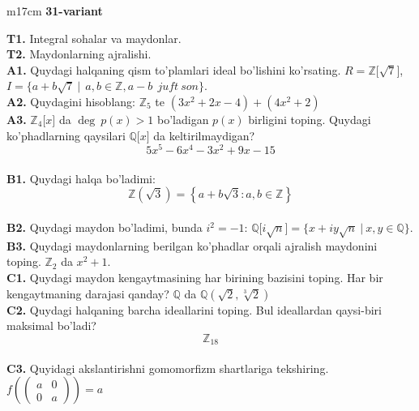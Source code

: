 \documentclass{article}
\begin{document}
\begin{tabular}{m{17cm}}
\textbf{31-variant}
\newline

\textbf{T1.} Integral sohalar va maydonlar. \\
\textbf{T2.} Maydonlarning ajralishi. \\
\textbf{A1.} Quydagi halqaning qism to'plamlari ideal bo'lishini ko'rsating.
\(R\mathbb{= Z\lbrack}\sqrt{7}\rbrack\), \(I = \{ a + b\sqrt{7}\ |\ \ a,b \in \mathbb{Z,}a - b\ \ juft\ son\}\). \\
\textbf{A2.} Quydagini hisoblang:
\(\mathbb{Z}_{5}\) te \(\left( 3x^{2} + 2x - 4 \right) + \left( 4x^{2} + 2 \right)\) \\
\textbf{A3.} \(\mathbb{Z}_{4}\lbrack x\rbrack\) da \(\deg\ p(x) > 1\) bo'ladigan \(p(x)\) birligini toping. Quydagi ko'phadlarning qaysilari \(\mathbb{Q\lbrack}x\rbrack\) da keltirilmaydigan?
\[5x^{5} - 6x^{4} - 3x^{2} + 9x - 15\] \\
\textbf{B1.} Quydagi halqa bo'ladimi:
\[\mathbb{Z}\left( \sqrt{3} \right) = \left\{ a + b\sqrt{3}:a,b \in \mathbb{Z} \right\}\] \\
\textbf{B2.} Quydagi maydon bo'ladimi, bunda \(i^{2} = - 1\):
\(\mathbb{Q\lbrack}i\sqrt{n}\rbrack = \{ x + iy\sqrt{n}\ |\ x,y \in \mathbb{Q\}}\). \\
\textbf{B3.} Quydagi maydonlarning berilgan ko'phadlar orqali ajralish maydonini toping.
\(\mathbb{Z}_{2}\) da \(x^{2} + 1\). \\
\textbf{C1.} Quydagi maydon kengaytmasining har birining bazisini toping. Har bir kengaytmaning darajasi qanday?
\(\mathbb{Q}\) da \(\mathbb{Q}\left( \sqrt{2},\sqrt[3]{2} \right)\) \\
\textbf{C2.} Quydagi halqaning barcha ideallarini toping. Bul ideallardan qaysi-biri maksimal bo'ladi?
\[\mathbb{Z}_{18}\] \\
\textbf{C3.} Quyidagi akslantirishni gomomorfizm shartlariga tekshiring. \(f\left( \begin{pmatrix}
a & 0 \\
0 & a
\end{pmatrix} \right) = a\) \\

\end{tabular}
\vspace{1cm}
\end{document}
